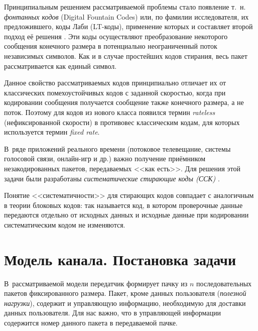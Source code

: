 Принципиальным решением рассматриваемой проблемы стало появление т.~н. \emph{фонтанных кодов} (Digital Fountain Codes)
или, по фамилии исследователя, их предложившего, коды Лаби (LT-коды),
применение которых и составляет второй подход её решения \cite{Luby, Mitzenmacher-2004, Kythe2012}.
Эти коды осуществляют преобразование некоторого сообщения конечного размера в потенциально неограниченный поток независимых символов.
Как и в случае простейших кодов стирания, весь пакет рассматривается как единый символ.

Данное свойство рассматриваемых кодов принципиально отличает их от классических помехоустойчивых кодов с заданной скоростью,
когда при кодировании сообщения получается сообщение также конечного размера, а не поток.
Поэтому для кодов из нового класса появился термин \emph{rateless} (нефиксированной скорости) в противовес классическим кодам,
для которых используется термин \emph{fixed rate}.

В~ряде приложений реального времени (потоковое телевещание, системы голосовой связи, онлайн-игр и др.) важно получение приёмником незакодированных пакетов, передаваемых <<как есть>>.
Для решения этой задачи были разработаны \emph{систематические стирающие коды (ССК)} \cite{Shin-Kor-2008}.

Понятие <<систематичности>> для стирающих кодов совпадает с аналогичным в теории блоковых кодов: так называется код, в котором проверочные данные передаются отдельно от исходных данных и исходные данные при кодировании систематическим кодом не изменяются.


\section{Модель канала. Постановка задачи}
В~рассматриваемой модели передатчик формирует пачку из $n$ последовательных пакетов фиксированного размера.
Пакет, кроме данных пользователя (\emph{полезной нагрузки}), содержит и управляющую информацию, необходимую для доставки данных пользователя. 
Для нас важно, что в управляющей информации содержится номер данного пакета в передаваемой пачке.

